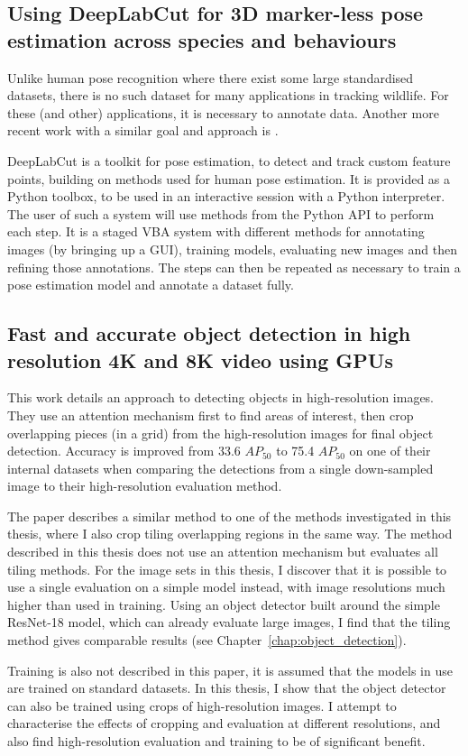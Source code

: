 \subsection {Using DeepLabCut for 3D marker-less pose estimation across species and behaviours \texorpdfstring{\cite{Nath2018, Mathis2018}}{}}

Unlike human pose recognition where there exist some large standardised datasets, there is no such dataset for many applications in tracking wildlife. For these (and other) applications, it is necessary to annotate data. Another more recent work with a similar goal and approach is \cite{Graving2019}.

DeepLabCut is a toolkit for pose estimation, to detect and track custom feature points, building on methods used for human pose estimation. It is provided as a Python toolbox, to be used in an interactive session with a Python interpreter. The user of such a system will use methods from the Python \gls{API} to perform each step. It is a staged \gls{VBA} system with different methods for annotating images (by bringing up a GUI), training models, evaluating new images and then refining those annotations. The steps can then be repeated as necessary to train a pose estimation model and annotate a dataset fully. 

\subsection{Fast and accurate object detection in high resolution 4K and 8K video using GPUs \texorpdfstring{\cite{Ruzicka2018}}{}}

This work details an approach to detecting objects in high-resolution images. They use an attention mechanism first to find areas of interest, then crop overlapping pieces (in a grid) from the high-resolution images for final object detection. Accuracy is improved from 33.6 $AP_{50}$ to 75.4 $AP_{50}$ on one of their internal datasets when comparing the detections from a single down-sampled image to their high-resolution evaluation method. 

The paper describes a similar method to one of the methods investigated in this thesis, where I also crop tiling overlapping regions in the same way. The method described in this thesis does not use an attention mechanism but evaluates all tiling methods. For the image sets in this thesis, I discover that it is possible to use a single evaluation on a simple model instead, with image resolutions much higher than used in training. Using an object detector built around the simple ResNet-18 model, which can already evaluate large images,  I find that the tiling method gives comparable results (see Chapter~\ref{chap:object_detection}).
 
Training is also not described in this paper, it is assumed that the models in use are trained on standard datasets. In this thesis, I show that the object detector can also be trained using crops of high-resolution images. I attempt to characterise the effects of cropping and evaluation at different resolutions, and also find high-resolution evaluation and training to be of significant benefit.
